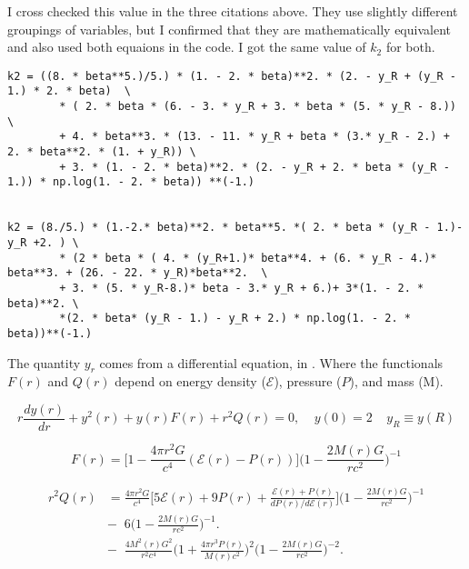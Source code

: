 \documentclass[11pt]{article}
\numberwithin{equation}{section}
\begin{document}
I cross checked this value in the three citations above.  They use slightly different groupings of variables, but I confirmed that they are mathematically equivalent and also used both equaions in the code.  I got the same value of $k_2$ for both.  

\begin{lstlisting}
k2 = ((8. * beta**5.)/5.) * (1. - 2. * beta)**2. * (2. - y_R + (y_R - 1.) * 2. * beta)  \
        * ( 2. * beta * (6. - 3. * y_R + 3. * beta * (5. * y_R - 8.)) \
        + 4. * beta**3. * (13. - 11. * y_R + beta * (3.* y_R - 2.) + 2. * beta**2. * (1. + y_R)) \
        + 3. * (1. - 2. * beta)**2. * (2. - y_R + 2. * beta * (y_R - 1.)) * np.log(1. - 2. * beta)) **(-1.)


k2 = (8./5.) * (1.-2.* beta)**2. * beta**5. *( 2. * beta * (y_R - 1.)- y_R +2. ) \
        * (2 * beta * ( 4. * (y_R+1.)* beta**4. + (6. * y_R - 4.)* beta**3. + (26. - 22. * y_R)*beta**2.  \
        + 3. * (5. * y_R-8.)* beta - 3.* y_R + 6.)+ 3*(1. - 2. * beta)**2. \
        *(2. * beta* (y_R - 1.) - y_R + 2.) * np.log(1. - 2. * beta))**(-1.) 
\end{lstlisting}

The quantity $y_r$ comes from a differential equation, in \cite{Moustakidis_2017}  .  Where the functionals $F(r)$ and $Q(r)$ depend on energy density ($\mathcal{E}$), pressure ($P$), and mass (M).

\begin{equation} \label{diffeq}
r \frac{dy(r)}{dr} + y^{2}(r) + y(r)F(r) + r^{2} Q(r) = 0, \;\;\;\; y(0)=2 \;\;\;\; y_{R} \equiv y(R)
\end{equation}

\begin{equation} \label{F}
F(r) = \bigg[ 1-\frac{4 \pi r^{2} G }{c^{4}} (\mathcal{E}(r)-P(r))  \bigg] \bigg( 1-\frac{2 M(r) G}{r c^{2}}  \bigg)^{-1}
\end{equation}

\begin{align} \label{eq:r2Q}
r^{2} Q(r) &= \frac{4 \pi r^{2} G}{c^{4}} \bigg[ 5 \mathcal{E}(r) + 9 P(r) + \frac{\mathcal{E}(r) + P(r)}{dP(r)/d\mathcal{E}(r)}   \bigg] \bigg(  1 - \frac{2 M(r) G}{r c^{2}} \bigg) ^{-1}  \\
& - \;\; 6 \bigg( 1- \frac{2 M(r) G}{r c^{2}}  \bigg)^{-1}. \nonumber  \\
& - \;\; \frac{4 M^{2}(r) G^{2}}{r^{2}c^{4}} \bigg( 1 + \frac{4 \pi  r^3 P(r)}{M(r) c^{2}}  \bigg)^{2} \bigg( 1 - \frac{2 M(r) G}{r c^{2}} \bigg)^{-2}. \nonumber
\end{align}
\end{document}
